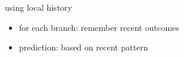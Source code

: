 \begin{frame}{using local history}
\begin{itemize}
    \item for each branch: remember recent outcomes
    \item prediction: based on recent pattern
\end{itemize}
\end{frame}
